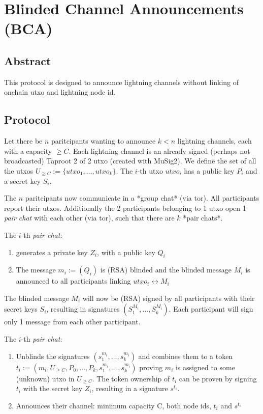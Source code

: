\documentclass[]{article}
\begin{document}
\section{Blinded Channel Announcements    (BCA)}


\subsection{ Abstract}
This protocol is designed to announce lightning channels without linking of onchain utxo and lightning node id.

\subsection{ Protocol}

Let there be $n$ paritcipants wanting to announce $k < n $ lightning channels, each with a capacity $ \geq C $.
Each lightning channel is an already signed (perhaps not broadcasted) Taproot 2 of 2 utxo (created with MuSig2).  We define the set of all the utxos $U_{\geq C} := \{utxo_1, \dots, utxo_k  \}$.
The $i$-th utxo $utxo_i$ has a public key $P_i$ and a secret key $S_i$.

The $n$ paritcipants now communicate in a *group chat* (via tor). All participants report their utxos.
Additionally the 2 participants belonging to 1 utxo open 1 \textit{pair chat} with each other (via tor), such that there are $k$ *pair chats*.

The $i$-th \textit{pair chat}:
\begin{enumerate}
 \item generates a private key $Z_i$, with a public key $Q_i$
 \item The message $m_i := (Q_i)$ is (RSA) blinded and the blinded message $M_i$ is announced to all participants linking $utxo_i \leftrightarrow M_i$
\end{enumerate}



The blinded message $M_i$ will now be (RSA) signed by all participants with their secret keys $S_i$, resulting in signatures $(S_1^{M_i}, \dots, S_k^{M_i})$.  Each participant will sign only 1 message from each other participant.

The $i$-th  \textit{pair chat}:
\begin{enumerate}
 \item Unblinds the signatures $(s_1^{m_i}, \dots, s_k^{m_i})$ and combines them to a token $t_i := (m_i,U_{\geq C}, P_0, \dots, P_k,  s_1^{m_i}, \dots, s_k^{m_i})$ proving $m_i$ is assigned to some (unknown) utxo in $U_{\geq C} $. The token ownership of $t_i$ can be proven by signing $t_i$ with the secret key $Z_i$, resulting in a signature $s^{t_i}$.
 \item Announces their channel: minimum capacity C, both node ids, $t_i$ and $s^{t_i}$

\end{enumerate}
\end{document}
